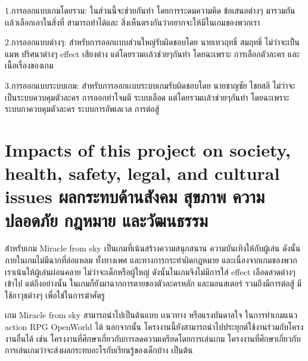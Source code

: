1.การออกแบบเกมโดยรวม: ในส่วนนี้จะช่วยกันทำ โดยการระดมความคิด ข้อเสนอต่างๆ มารวมกันเเล้วเลือกเอาในสิ่งที่ สามารถทำได้และ สิ่งเห็นตรงกันว่าอยากจะให้มีในเกมของพวกเรา

2.การออกแบบต่างๆ: สำหรับการออกเเบบส่วนใหญ่รับผิดชอบโดย นายเทวฤทธิ์ สมฤทธิ์ ไม่ว่าจะเป็น แมพ ปริศนาต่างๆ effect เสียงต่าง แต่โดยรวมเเล้วช่วยๆกันทำ โดยฉะเพราะ การเลือกตัวละคร และเนื้อเรื่องของเกม

3.การออกแบบระบบเกม: สำหรับการออกเเบบระบบเกมรับผิดชอบโดย นายชาญชัย ไชยสลี ไม่ว่าจะเป็นระบบควบคุมตัวละคร การออกท่าโจมตี ระบบเลือด แต่โดยรวมเเล้วช่วยๆกันทำ โดยฉะเพราะ ระบบกาควบคุมตัวละคร ระบบการอัพเลเวล การต่อสู้

\section{\ifenglish%
Impacts of this project on society, health, safety, legal, and cultural issues
\else%
ผลกระทบด้านสังคม สุขภาพ ความปลอดภัย กฎหมาย และวัฒนธรรม
\fi}
\enskip \enskip \enskip \enskip \enskip สำหรับเกม Miracle from sky เป็นเกมที่เน้นสร้างความสนุกสนาน ความบันเทิงให้กับผู้เล่น ดังนั้นภายในเกมไม่มีฉากที่ล่อแหลม ทั้งทางเพศ และทางการกระทำผิดกฎหมาย และเนื่องจากเกมของพวกเราเน้นให้ผู้เล่นผ่อนคลาย ไม่ว่าจะเด็กหรือผู้ใหญ่ ดังนั้นในเกมจึงไม่มีการใส่ effect เลือดสาดต่างๆเข้าไป แต่ถึงอย่างนั้น 
ในเกมก็ยังมาฉากการตายของตัวละครหลัก และมอนสเตอร์ รวมถึงมีการต่อสู้ มีใช้อาวุธต่างๆ เพื่อใช่ในการฆ่าศัตรู

\enskip \enskip เกม Miracle from sky สามารถนำไปเป็นต้นแบบ เเนวทาง หรือแรงบันดาลใจ ในการทำเกมแนว action RPG OpenWorld ได้ นอกจากนั้น โครงงานนี้ยังสามารถนำไปประยุกต์ใช้งานร่วมกับโครงงานอื่นได้ เช่น โครงงานที่ศึกษาเกี่ยวกับการลดความเครียดโดยการเล่นเกม โครงงานที่ศึกษาเกี่ยวกับการเล่นเกมว่าจะส่งผลกระทบอะไรกับเรียนรู้ของเด็กบ้าง เป็นต้น


